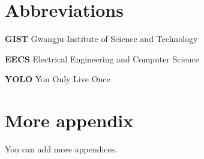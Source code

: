 

\appendix

\chapter{Abbreviations}
\text{ } \text{ }  \textbf{GIST} \text{ } \text{ } Gwangju Institute of Science and Technology

\textbf{EECS}  \text{ } \text{ } Electrical Engineering and Computer Science

\textbf{YOLO}  \text{ } \text{ } You Only Live Once



\chapter{More appendix}

You can add more appendices.